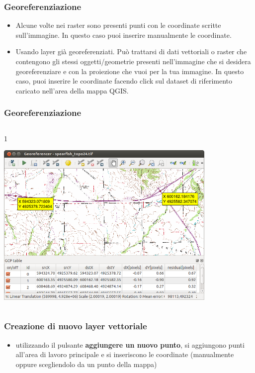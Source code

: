 \documentclass{beamer}
\begin{document}
{\begin{frame}
    \frametitle{Georeferenziazione}

    \begin{itemize}
        \item Alcune volte nei raster sono presenti punti con le coordinate scritte sull’immagine. In questo caso puoi inserire manualmente le coordinate.
    
        \item Usando layer già georeferenziati. Può trattarsi di dati vettoriali o raster che contengono gli stessi oggetti/geometrie presenti nell’immagine che si desidera georeferenziare e con la proiezione che vuoi per la tua immagine. In questo caso, puoi inserire le coordinate facendo click sul dataset di riferimento caricato nell’area della mappa QGIS.
    \end{itemize}

    
\end{frame} 


\begin{frame}
   \frametitle{Georeferenziazione}
 	\begin{columns}
		\begin{column} {1\textwidth}	
			 \begin{center}
			\includegraphics[width=0.8\textwidth] {pics/georef1.png}
		    \end{center}
		\end{column}
 		
	\end{columns}	
	   
\end{frame}

\begin{frame}
\frametitle{Creazione di nuovo layer vettoriale}
    \begin{itemize}
        \item utilizzando il pulsante \textbf{aggiungere un nuovo punto}, si aggiungono punti all’area di lavoro principale e si inseriscono le coordinate (manualmente oppure scegliendolo da un punto della mappa)
    		

\end{itemize}
\end{frame}}
\end{document}
